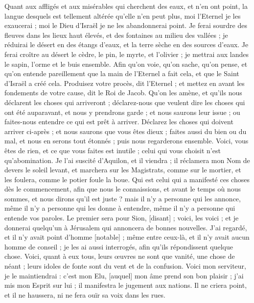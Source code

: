 \begin{multicols}{2}
Quant aux affligés et aux misérables qui cherchent des eaux, et n'en ont point, la langue desquels est tellement altérée qu'elle n'en peut plus, moi l'Eternel je les exaucerai ; moi le Dieu d'Israël je ne les abandonnerai point.
Je ferai sourdre des fleuves dans les lieux haut élevés, et des fontaines au milieu des vallées ; je réduirai le désert en des étangs d'eaux, et la terre sèche en des sources d'eaux.
Je ferai croître au désert le cèdre, le pin, le myrte, et l'olivier ; je mettrai aux landes le sapin, l'orme et le buis ensemble.
Afin qu'on voie, qu'on sache, qu'on pense, et qu'on entende pareillement que la main de l'Eternel a fait cela, et que le Saint d'Israël a créé cela.
Produisez votre procès, dit l'Eternel ; et mettez en avant les fondements de votre cause, dit le Roi de Jacob.
Qu'on les amène, et qu'ils nous déclarent les choses qui arriveront ; déclarez-nous que veulent dire les choses qui ont été auparavant, et nous y prendrons garde ; et nous saurons leur issue ; ou faites-nous entendre ce qui est prêt à arriver.
Déclarez les choses qui doivent arriver ci-après ; et nous saurons que vous êtes dieux ; faites aussi du bien ou du mal, et nous en serons tout étonnés ; puis nous regarderons ensemble.
Voici, vous êtes de rien, et ce que vous faites est inutile ; celui qui vous choisit n'est qu'abomination.
Je l'ai suscité d'Aquilon, et il viendra ; il réclamera mon Nom de devers le soleil levant, et marchera sur les Magistrats, comme sur le mortier, et les foulera, comme le potier foule la boue.
Qui est celui qui a manifesté ces choses dès le commencement, afin que nous le connaissions, et avant le temps où nous sommes, et nous dirons qu'il est juste ? mais il n'y a personne qui les annonce, même il n'y a personne qui les donne à entendre, même il n'y a personne qui entende vos paroles.
Le premier sera pour Sion, [disant] ; voici, les voici ; et je donnerai quelqu'un à Jérusalem qui annoncera de bonnes nouvelles.
J'ai regardé, et il n'y avait point d'homme [notable] ; même entre ceux-là, et il n'y avait aucun homme de conseil ; je les ai aussi interrogés, afin qu'ils répondissent quelque chose.
Voici, quant à eux tous, leurs œuvres ne sont que vanité, une chose de néant ; leurs idoles de fonte sont du vent et de la confusion.
\VerseOne{}Voici mon serviteur, je le maintiendrai : c'est mon Elu, [auquel] mon âme prend son bon plaisir ; j'ai mis mon Esprit sur lui ; il manifestra le jugement aux nations.
Il ne criera point, et il ne haussera, ni ne fera ouïr sa voix dans les rues.

\end{multicols}
